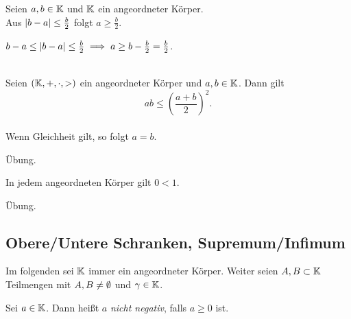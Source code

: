 \documentclass[../ana1.tex]{subfiles}
\begin{document}
\begin{bsp}
	Seien \(a , b \in \mathbb{K} \) und \(\mathbb{K} \) ein angeordneter Körper. \\
	Aus \(\left|b - a\right| \leq \frac{b}{2} \) folgt \(a \geq \frac{b}{2} \).
\end{bsp}
\begin{bew}
	\(b-a \leq \left|b-a\right| \leq \frac{b}{2} \implies a \geq b - \frac{b}{2} = \frac{b}{2} \).
\end{bew}

\begin{kor}\label{kor:gaungl}\leavevmode \\
	Seien \((\mathbb{K} , + , \cdot , >) \) ein angeordneter Körper und \(a , b \in \mathbb{K} \). Dann gilt \\
		\[ab \leq {\left( \frac{a + b}{2}\right)}^{2}. \] \\
	Wenn Gleichheit gilt, so folgt \(a=b \).
\end{kor}
\begin{bew}
	Übung.\phantom{\qedhere}
\end{bew}

\begin{bem}
	In jedem angeordneten Körper gilt \(0 < 1 \).
\end{bem}
\begin{bew}
	Übung.\phantom{\qedhere}
\end{bew}


\subsection{Obere/Untere Schranken, Supremum/Infimum}
\begin{prosa}
	Im folgenden sei \(\mathbb{K} \) immer ein angeordneter Körper. Weiter seien \(A , B \subset \mathbb{K} \) Teilmengen mit \(A , B \neq \emptyset \) und
	\(\gamma \in \mathbb{K} \).
\end{prosa}

\begin{notation}
	Sei \(a \in \mathbb{K} \). Dann heißt \(a \) \textit{nicht negativ}, falls \(a \geq 0 \) ist.
\end{notation}
\end{document}

